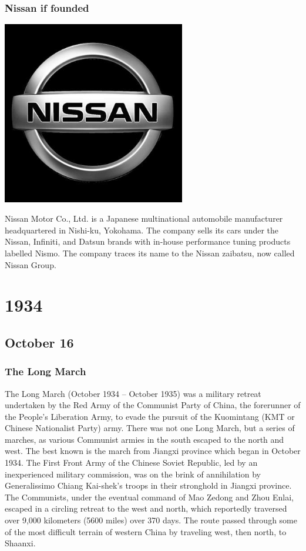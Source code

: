 \documentclass[11pt]{report}
\begin{document}
\subsection{Nissan if founded}
\vspace{2mm}\begin{center}\includegraphics[width=8cm]{./img/nissan.jpg}\end{center}
Nissan Motor Co., Ltd. is a Japanese multinational automobile manufacturer headquartered in Nishi-ku, Yokohama. The company sells its cars under the Nissan, Infiniti, and Datsun brands with in-house performance tuning products labelled Nismo. The company traces its name to the Nissan zaibatsu, now called Nissan Group.

\chapter{1934}
\section{October 16}
\subsection{The Long March}
The Long March (October 1934 – October 1935) was a military retreat undertaken by the Red Army of the Communist Party of China, the forerunner of the People's Liberation Army, to evade the pursuit of the Kuomintang (KMT or Chinese Nationalist Party) army. There was not one Long March, but a series of marches, as various Communist armies in the south escaped to the north and west. The best known is the march from Jiangxi province which began in October 1934. The First Front Army of the Chinese Soviet Republic, led by an inexperienced military commission, was on the brink of annihilation by Generalissimo Chiang Kai-shek's troops in their stronghold in Jiangxi province. The Communists, under the eventual command of Mao Zedong and Zhou Enlai, escaped in a circling retreat to the west and north, which reportedly traversed over 9,000 kilometers (5600 miles) over 370 days. The route passed through some of the most difficult terrain of western China by traveling west, then north, to Shaanxi.
\end{document}
